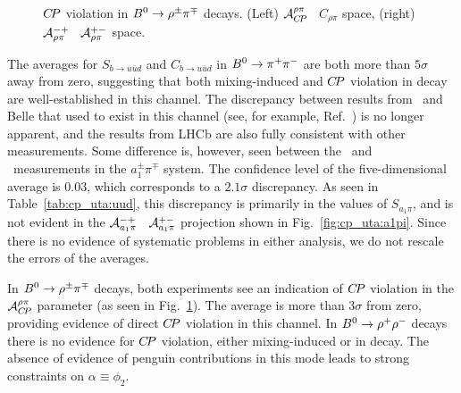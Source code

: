 \begin{figure}[htbp]
\begin{center}
{    }
  \end{center}
  \vspace{-0.8cm}
  \caption{
    $C\!P$ violation in $B^0\to\rho^\pm\pi^\mp$ decays.
    (Left) ${\cal A}^{\rho\pi}_{C\!P}$ \vs\ $C_{\rho\pi}$ space,
    (right) ${\cal A}^{-+}_{\rho\pi}$ \vs\ ${\cal A}^{+-}_{\rho\pi}$ space.
  }
  \label{fig:cp_uta:uud:rhopi-dircp}
\end{figure}

The averages for $S_{b \to u\bar u d}$ and $C_{b \to u\bar u d}$ 
in $B^0 \to \pi^+\pi^-$ are both more than $5\sigma$ away from zero,
suggesting that both mixing-induced and $C\!P$ violation in decay
are well-established in this channel.
The discrepancy between results from \babar\ and Belle that used to exist in
this channel (see, for example, Ref.~\cite{Asner:2010qj}) is no longer
apparent, and the results from LHCb are also fully consistent with other
measurements.  
Some difference is, however, seen between the \babar\ and \belle\ measurements
in the $a_1^\pm\pi^\mp$ system. 
The confidence level of the five-dimensional average is $0.03$,
which corresponds to a $2.1\sigma$ discrepancy.  
As seen in Table~\ref{tab:cp_uta:uud}, this discrepancy is primarily in the
values of $S_{a_1\pi}$, and is not evident in the ${\cal A}^{-+}_{a_1\pi}$
\vs\ ${\cal A}^{+-}_{a_1\pi}$ projection shown in Fig.~\ref{fig:cp_uta:a1pi}.
Since there is no
evidence of systematic problems in either analysis,
we do not rescale the errors of the averages.

In $B^0 \to \rho^\pm\pi^\mp$ decays,
both experiments see an indication of $C\!P$ violation in the 
${\cal A}^{\rho\pi}_{C\!P}$ parameter 
(as seen in Fig.~\ref{fig:cp_uta:uud:rhopi-dircp}).
The average is more than $3\sigma$ from zero,
providing evidence of direct $C\!P$ violation in this channel.
In $B^0 \to \rho^+\rho^-$ decays there is no evidence for $C\!P$ violation,
either mixing-induced or in decay.
The absence of evidence of penguin contributions in this mode leads to
strong constraints on $\alpha \equiv \phi_2$.

\label{sec:cp_uta:cus:alpha}

